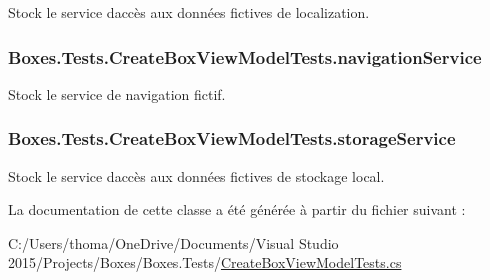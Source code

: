 Stock le service d\textquotesingle{}accès aux données fictives de localization. 

\subsubsection[{\texorpdfstring{navigation\+Service}{navigationService}}]{ Boxes.\+Tests.\+Create\+Box\+View\+Model\+Tests.\+navigation\+Service\hspace{0.3cm}{\ttfamily [private]}}\hypertarget{class_boxes_1_1_tests_1_1_create_box_view_model_tests_a4b133a0a51f3a1fccdbfe2c4e110c526}{}\label{class_boxes_1_1_tests_1_1_create_box_view_model_tests_a4b133a0a51f3a1fccdbfe2c4e110c526}


Stock le service de navigation fictif. 

\subsubsection[{\texorpdfstring{storage\+Service}{storageService}}]{ Boxes.\+Tests.\+Create\+Box\+View\+Model\+Tests.\+storage\+Service\hspace{0.3cm}{\ttfamily [private]}}\hypertarget{class_boxes_1_1_tests_1_1_create_box_view_model_tests_a0f47944eb8fc4ec9d3fa19aef2e597a4}{}\label{class_boxes_1_1_tests_1_1_create_box_view_model_tests_a0f47944eb8fc4ec9d3fa19aef2e597a4}


Stock le service d\textquotesingle{}accès aux données fictives de stockage local. 



La documentation de cette classe a été générée à partir du fichier suivant \+:\begin{DoxyCompactItemize}
\item 
C\+:/\+Users/thoma/\+One\+Drive/\+Documents/\+Visual Studio 2015/\+Projects/\+Boxes/\+Boxes.\+Tests/\hyperlink{_create_box_view_model_tests_8cs}{Create\+Box\+View\+Model\+Tests.\+cs}\end{DoxyCompactItemize}
